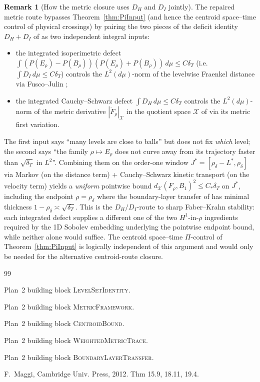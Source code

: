 \documentclass[11pt]{article}
\theoremstyle{definition}
\newtheorem{remark}[theorem]{Remark}
\begin{document}
\begin{remark}[How the metric closure uses $D_H$ and $D_I$ jointly]
\label{rem:DH-DI-joint}
The repaired metric route \cite{WeightedMetricTrace} bypasses
Theorem~\ref{thm:PiInput} (and hence the centroid space--time control
of physical crossings) by pairing the two pieces of the deficit
identity $D_H+D_I$ of \cite{LevelSetIdentity} as two independent
integral inputs:

\begin{itemize}
\item the integrated isoperimetric defect
$\int(P(E_\rho)-P(B_\rho))(P(E_\rho)+P(B_\rho))\,d\mu\le C\delta_T$
(i.e.\ $\int D_I\,d\mu\le C\delta_T$) controls the $L^2(d\mu)$-norm of
the levelwise Fraenkel distance via Fusco--Julin
\cite[Lemma~3.1]{WeightedMetricTrace};

\item the integrated Cauchy--Schwarz defect
$\int D_H\,d\mu\le C\delta_T$ controls the $L^2(d\mu)$-norm of the
metric derivative $|\dot F_\rho|_{\mathcal X}$ in the quotient space
$\mathcal X$ of \cite{MetricFramework} via its metric first variation.
\end{itemize}

The first input says ``many levels are close to balls'' but does not
fix \emph{which} level; the second says ``the family $\rho\mapsto E_\rho$
does not curve away from its trajectory faster than $\sqrt{\delta_T}$
in $L^2$''.  Combining them on the order-one window
$J^*=[\rho_\delta-L^*,\rho_\delta]$ via Markov (on the distance term) +
Cauchy--Schwarz kinetic transport (on the velocity term) yields a
\emph{uniform} pointwise bound $d_{\mathcal X}(F_\rho,B_1)^2\le C_*\delta_T$ on
$J^*$, including the endpoint $\rho=\rho_\delta$ where the
boundary-layer transfer of \cite{BoundaryLayerTransfer} has minimal
thickness $1-\rho_\delta\asymp\sqrt{\delta_T}$.  This is the
$D_H/D_I$-route to sharp Faber--Krahn stability: each integrated
defect supplies a different one of the two $H^1$-in-$\rho$ ingredients
required by the 1D Sobolev embedding underlying the pointwise endpoint
bound, while neither alone would suffice. The centroid space--time
$\Pi$-control of Theorem~\ref{thm:PiInput} is logically independent of
this argument and would only be needed for the alternative
centroid-route closure.
\end{remark}

\begin{thebibliography}{99}

Plan~2 building block \textsc{LevelSetIdentity}.

Plan~2 building block \textsc{MetricFramework}.

Plan~2 building block \textsc{CentroidBound}.

Plan~2 building block \textsc{WeightedMetricTrace}.

Plan~2 building block \textsc{BoundaryLayerTransfer}.

F.~Maggi, Cambridge Univ. Press, 2012. Thm 15.9, 18.11, 19.4.

\end{thebibliography}
\end{document}

